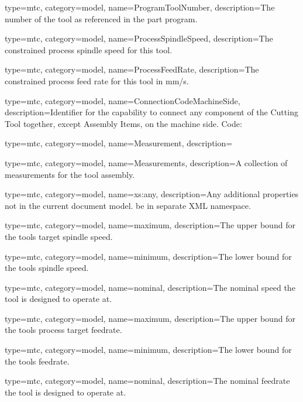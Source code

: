 {
  type=mtc,
  category=model,
  name={ProgramToolNumber},
  description={The number of the tool as referenced in the part program.}
}


{
  type=mtc,
  category=model,
  name={ProcessSpindleSpeed},
  description={The constrained process spindle speed for this tool.}
}


{
  type=mtc,
  category=model,
  name={ProcessFeedRate},
  description={The constrained process feed rate for this tool in mm/s.}
}


{
  type=mtc,
  category=model,
  name={ConnectionCodeMachineSide},
  description={Identifier for the capability to connect any component of the Cutting Tool together, except Assembly Items, on the machine side. Code: }
}


{
  type=mtc,
  category=model,
  name={Measurement},
  description={}
}

{
  type=mtc,
  category=model,
  name={Measurements},
  description={A collection of measurements for the tool assembly.}
}


{
  type=mtc,
  category=model,
  name={xs:any},
  description={Any additional properties not in the current document model. \MUST be in separate XML namespace.}
}


{
  type=mtc,
  category=model,
  name={maximum},
  description={The upper bound for the tools target spindle speed.}
}


{
  type=mtc,
  category=model,
  name={minimum},
  description={The lower bound for the tools spindle speed.}
}


{
  type=mtc,
  category=model,
  name={nominal},
  description={The nominal speed the tool is designed to operate at.}
}


{
  type=mtc,
  category=model,
  name={maximum},
  description={The upper bound for the tools process target feedrate.}
}


{
  type=mtc,
  category=model,
  name={minimum},
  description={The lower bound for the tools feedrate.}
}


{
  type=mtc,
  category=model,
  name={nominal},
  description={The nominal feedrate the tool is designed to operate at.}
}


